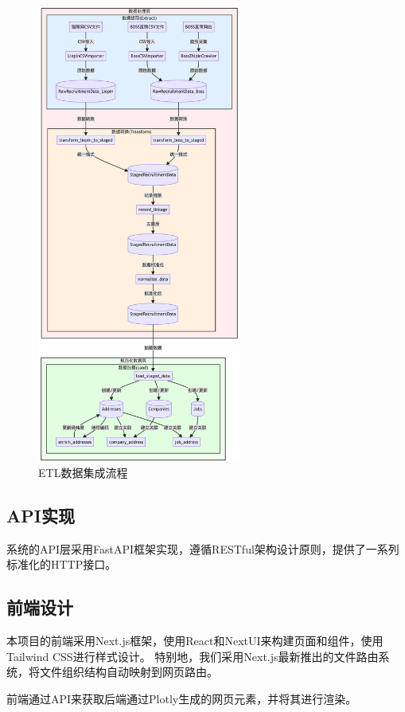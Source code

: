 \begin{figure}[htbp]
    \centering
    \includegraphics[width=0.6\textwidth]{figures/ETL.png}
    \caption{ETL数据集成流程}
    \label{fig:ETL1}
\end{figure}

\subsection{API实现}

系统的API层采用FastAPI框架实现，遵循RESTful架构设计原则，提供了一系列标准化的HTTP接口。

\subsection{前端设计}
本项目的前端采用Next.js框架，使用React和NextUI来构建页面和组件，使用Tailwind CSS进行样式设计。
特别地，我们采用Next.js最新推出的文件路由系统，将文件组织结构自动映射到网页路由。

前端通过API来获取后端通过Plotly生成的网页元素，并将其进行渲染。